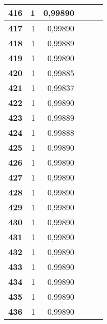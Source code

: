 {\begin{longtable}{|r|r|r|l|r|r|}
\textbf{416} & 1 & 0,99890 &  & \multicolumn{1}{l|}{} & \multicolumn{1}{l|}{} \\ \hline
\textbf{417} & 1 & 0,99890 &  & \multicolumn{1}{l|}{} & \multicolumn{1}{l|}{} \\ \hline
\textbf{418} & 1 & 0,99889 &  & \multicolumn{1}{l|}{} & \multicolumn{1}{l|}{} \\ \hline
\textbf{419} & 1 & 0,99890 &  & \multicolumn{1}{l|}{} & \multicolumn{1}{l|}{} \\ \hline
\textbf{420} & 1 & 0,99885 &  & \multicolumn{1}{l|}{} & \multicolumn{1}{l|}{} \\ \hline
\textbf{421} & 1 & 0,99837 &  & \multicolumn{1}{l|}{} & \multicolumn{1}{l|}{} \\ \hline
\textbf{422} & 1 & 0,99890 &  & \multicolumn{1}{l|}{} & \multicolumn{1}{l|}{} \\ \hline
\textbf{423} & 1 & 0,99889 &  & \multicolumn{1}{l|}{} & \multicolumn{1}{l|}{} \\ \hline
\textbf{424} & 1 & 0,99888 &  & \multicolumn{1}{l|}{} & \multicolumn{1}{l|}{} \\ \hline
\textbf{425} & 1 & 0,99890 &  & \multicolumn{1}{l|}{} & \multicolumn{1}{l|}{} \\ \hline
\textbf{426} & 1 & 0,99890 &  & \multicolumn{1}{l|}{} & \multicolumn{1}{l|}{} \\ \hline
\textbf{427} & 1 & 0,99890 &  & \multicolumn{1}{l|}{} & \multicolumn{1}{l|}{} \\ \hline
\textbf{428} & 1 & 0,99890 &  & \multicolumn{1}{l|}{} & \multicolumn{1}{l|}{} \\ \hline
\textbf{429} & 1 & 0,99890 &  & \multicolumn{1}{l|}{} & \multicolumn{1}{l|}{} \\ \hline
\textbf{430} & 1 & 0,99890 &  & \multicolumn{1}{l|}{} & \multicolumn{1}{l|}{} \\ \hline
\textbf{431} & 1 & 0,99890 &  & \multicolumn{1}{l|}{} & \multicolumn{1}{l|}{} \\ \hline
\textbf{432} & 1 & 0,99890 &  & \multicolumn{1}{l|}{} & \multicolumn{1}{l|}{} \\ \hline
\textbf{433} & 1 & 0,99890 &  & \multicolumn{1}{l|}{} & \multicolumn{1}{l|}{} \\ \hline
\textbf{434} & 1 & 0,99890 &  & \multicolumn{1}{l|}{} & \multicolumn{1}{l|}{} \\ \hline
\textbf{435} & 1 & 0,99890 &  & \multicolumn{1}{l|}{} & \multicolumn{1}{l|}{} \\ \hline
\textbf{436} & 1 & 0,99890 &  & \multicolumn{1}{l|}{} & \multicolumn{1}{l|}{} \\ \hline

\end{longtable}}
